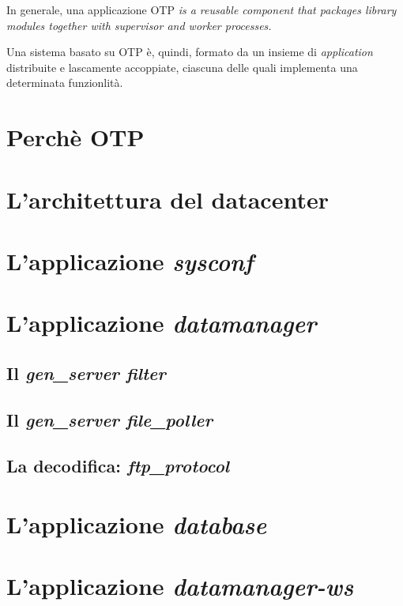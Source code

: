 %
In generale, una applicazione OTP \emph{is a reusable component that packages library modules 
together with supervisor and worker processes.}

%
Una sistema basato su OTP \`e, quindi, formato da un insieme di \emph{application} distribuite 
e lascamente accoppiate, ciascuna delle quali implementa una determinata funzionlit\`a. 
%













\section{Perch\`e OTP}

\section{L'architettura del datacenter}
\label{datacenter-arch}
\section{L'applicazione \emph{sysconf}}
\section{L'applicazione \emph{datamanager}}
\subsection{Il \emph{gen\_server filter}}
\subsection{Il \emph{gen\_server file\_poller}}
\subsection{La decodifica: \emph{ftp\_protocol}}
\section{L'applicazione \emph{database}}
\section{L'applicazione \emph{datamanager-ws}}
